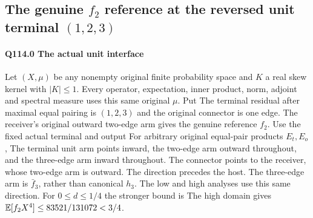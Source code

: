 \subsection{The genuine $f_2$ reference at the reversed unit terminal $(1,\allowbreak 2,\allowbreak 3)$}\label{proof:Q5-C114}
\paragraph{Q114.0 The actual unit interface}\label{part:Q114.0}
Let $(X,\allowbreak \mu)$ be any nonempty original finite probability space and $K$
a real skew kernel with $|K|\le\allowbreak 1$. Every operator, expectation, inner
product, norm, adjoint and spectral measure uses this same original $\mu$.
Put
The terminal residual after maximal equal pairing is $(1,\allowbreak 2,\allowbreak 3)$ and the
original connector is one edge. The receiver's original outward two-edge
arm gives the genuine reference $f_2$.
Use the fixed actual terminal and output
For arbitrary original equal-pair products $E_t,\allowbreak E_o$,
The terminal unit arm points inward, the two-edge arm outward throughout,
and the three-edge arm inward throughout. The connector points
to the receiver, whose two-edge arm is outward.
The direction precedes the host. The three-edge arm is $\bar f_3$,
rather than canonical $h_3$.
The low and high analyses use this same direction. For $0\le\allowbreak  d\le\allowbreak 1/4$
the stronger bound is
The high domain gives $\mathbb E[f_2X^4]\le\allowbreak 83521/131072<\allowbreak 3/4$.

